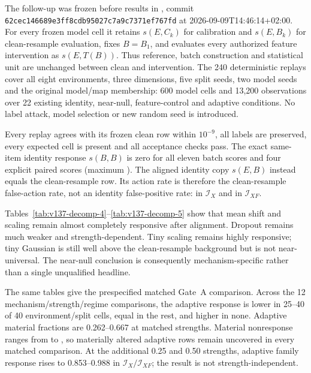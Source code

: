 \documentclass[10pt,journal,compsoc]{IEEEtran}
\newcommand{\IX}{\mathcal I_X}
\newcommand{\IXF}{\mathcal I_{XF}}
\begin{document}
The follow-up was frozen before results in
, commit
\texttt{62cec146689e3ff8cdb95027c7a9c7371ef767fd} at
2026-09-09T14:46:14+02:00. For every frozen model cell it retains
$s(E,C_k)$ for calibration and $s(E,B_k)$ for clean-resample evaluation, fixes
$B=B_1$, and evaluates every authorized feature intervention as
$s(E,T(B))$. Thus reference, batch construction and statistical unit are
unchanged between clean and intervention. The 240 deterministic replays cover
all eight environments, three dimensions, five split seeds, two model seeds
and the original model/map membership: 600 model cells and 13,200 observations
over 22 existing identity, near-null, feature-control and adaptive conditions.
No label attack, model selection or new random seed is introduced.

Every replay agrees with its frozen clean row within $10^{-9}$, all labels are
preserved, every expected cell is present and all acceptance checks pass. The
exact same-item identity response $s(B,B)$ is zero for all eleven batch scores
and four explicit paired scores (maximum \GeoIdentityMax{}). The aligned
identity copy $s(E,B)$ instead equals the clean-resample row. Its action rate is
therefore the clean-resample false-action rate, not an identity false-positive
rate: \GeoCleanFamilyIX{} in $\IX$ and \GeoCleanFamilyIXF{} in $\IXF$.

Tables~\ref{tab:v137-decomp-4}--\ref{tab:v137-decomp-5} show that mean shift and scaling remain
almost completely responsive after alignment. Dropout remains much weaker and
strength-dependent. Tiny scaling remains highly responsive; tiny Gaussian is
still well above the clean-resample background but is not near-universal. The
near-null conclusion is consequently mechanism-specific rather than a single
unqualified headline.

The same tables give the prespecified matched Gate~A comparison. Across the
12 mechanism/strength/regime comparisons, the adaptive
response is lower in 25--40 of 40 environment/split cells, equal in the rest,
and higher in none. Adaptive material fractions are 0.262--0.667 at matched
strengths. Material nonresponse ranges from \GeoGateMaterialNonresponseMin{} to
\GeoGateMaterialNonresponseMax{}, so materially
altered adaptive rows remain uncovered in every matched comparison. At the
additional 0.25 and 0.50 strengths, adaptive family response rises to
0.853--0.988 in $\IX/\IXF$; the result is not strength-independent.
\end{document}
